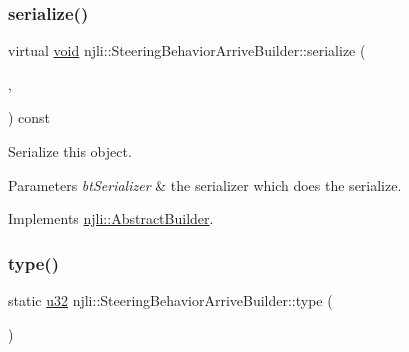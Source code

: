 \mbox{\label{classnjli_1_1_steering_behavior_arrive_builder_ab2db80fafdc9da01f1869d1cbfabef7f}} 
\subsubsection{\texorpdfstring{serialize()}{serialize()}}
{\footnotesize\ttfamily virtual \mbox{\hyperlink{_thread_8h_af1e856da2e658414cb2456cb6f7ebc66}{void}} njli\+::\+Steering\+Behavior\+Arrive\+Builder\+::serialize (\begin{DoxyParamCaption}\item[{\mbox{\hyperlink{_thread_8h_af1e856da2e658414cb2456cb6f7ebc66}{void}} $\ast$}]{,  }\item[{bt\+Serializer $\ast$}]{ }\end{DoxyParamCaption}) const\hspace{0.3cm}{\ttfamily [virtual]}}

Serialize this object.


\begin{DoxyParams}{Parameters}
{\em bt\+Serializer} & the serializer which does the serialize. \\
\hline
\end{DoxyParams}


Implements \mbox{\hyperlink{classnjli_1_1_abstract_builder_ab66b774e02ccb9da554c9aab7fa6d981}{njli\+::\+Abstract\+Builder}}.

\mbox{\label{classnjli_1_1_steering_behavior_arrive_builder_a0ec3d9504d8f29944baf9e3ec5b1929e}} 
\subsubsection{\texorpdfstring{type()}{type()}}
{\footnotesize\ttfamily static \mbox{\hyperlink{_util_8h_a10e94b422ef0c20dcdec20d31a1f5049}{u32}} njli\+::\+Steering\+Behavior\+Arrive\+Builder\+::type (\begin{DoxyParamCaption}{ }\end{DoxyParamCaption})\hspace{0.3cm}{\ttfamily [static]}}

